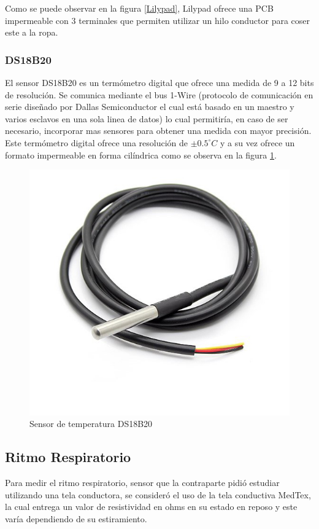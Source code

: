 Como se puede observar en la figura \ref{Lilypad}, Lilypad ofrece una PCB impermeable con 3 terminales que permiten utilizar un hilo conductor para coser este a la ropa.

\subsubsection{DS18B20}
El sensor DS18B20\cite{temp} es un termómetro digital que ofrece una medida de 9 a 12 bits de resolución. Se comunica mediante el bus 1-Wire (protocolo de comunicación en serie diseñado por Dallas Semiconductor el cual está basado en un maestro y varios esclavos en una sola linea de datos) lo cual permitiría, en caso de ser necesario, incorporar mas sensores para obtener una medida con mayor precisión. 
Este termómetro digital ofrece una resolución de $\pm0.5^\circ C$ y a su vez ofrece un formato impermeable en forma cilíndrica como se observa en la figura \ref{DS18B20}.

\begin{figure}[H]
\centering
\includegraphics[scale=0.2]{figuras/sensor/t/ds18.jpg}
\caption{Sensor de temperatura DS18B20}
\label{DS18B20}
\end{figure}

\subsection{Ritmo Respiratorio}
Para medir el ritmo respiratorio, sensor que la contraparte pidió estudiar utilizando una tela conductora, se consideró el uso de la tela conductiva MedTex, la cual entrega un valor de resistividad en ohms en su estado en reposo y este varía dependiendo de su estiramiento.\\

